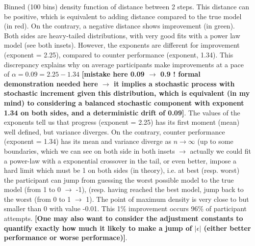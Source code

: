 Binned (100 bins) density function of distance between 2 steps. This distance can be positive, which is equivalent to adding distance compared to the true model (in red). On the contrary, a negative distance shows improvement (in green). Both sides are heavy-tailed distributions, with very good fits with a power law model (see both insets). However, the exponents are different for improvement (exponent = 2.25), compared to counter performance (exponent, 1.34). This discrepancy explains why on average participants make improvements at a pace of $\alpha = 0.09 = 2.25 - 1.34$ {\bf [mistake here 0.09 $\rightarrow$ 0.9 ! formal demonstration needed here $\rightarrow$ it implies a stochastic process with stochastic increment given this distribution, which is equivalent (in my mind) to considering a balanced stochastic component with exponent 1.34 on both sides, and a deterministic drift of 0.09]}. The values of the exponents tell us that progress (exponent = 2.25) has its first moment (mean) well defined, but variance diverges. On the contrary, counter performance (exponent = 1.34) has its mean and variance diverge as $n \rightarrow \infty$ (up to some boundaries, which we can see on both side in both insets $\rightarrow$ actually we could fit a power-law with a exponential crossover in the tail, or even better, impose a hard limit which must be 1 on both sides (in theory), i.e. at best (resp. worst) the participant can jump from guessing the worst possible model to the true model (from 1 to 0 $\rightarrow$ -1), (resp. having reached the best model, jump back to the worst (from 0 to 1 $\rightarrow$ 1). The point of maximum density is very close to but smaller than 0 with value -0.01. This 1\% improvement occurs 96\% of participant attempts. {\bf [One may also want to consider the adjustment constants to quantify exactly how much it likely to make a jump of $|\epsilon|$ (either better performance or worse performace)]}.